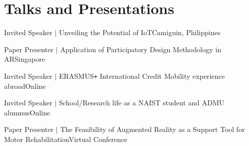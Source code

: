 \section{Talks and Presentations}
\cvSubHeadingListStart

{Invited Speaker $|$ Unveiling the Potential of IoT}{Camiguin, Philippines}
\vspace{5pt}

{Paper Presenter $|$ Application of Participatory Design Methodology in AR}{Singapore}
\vspace{5pt}

{Invited Speaker $|$ ERASMUS{\texttt{\large+}} International Credit Mobility experience abroad}{Online}
\vspace{5pt}

{Invited Speaker $|$ School/Research life as a NAIST student and ADMU alumnus}{Online}
\vspace{5pt}

{Paper Presenter $|$ The Feasibility of Augmented Reality as a Support Tool for Motor Rehabilitation}{Virtual Conference}
\vspace{5pt}

\cvSubHeadingListEnd